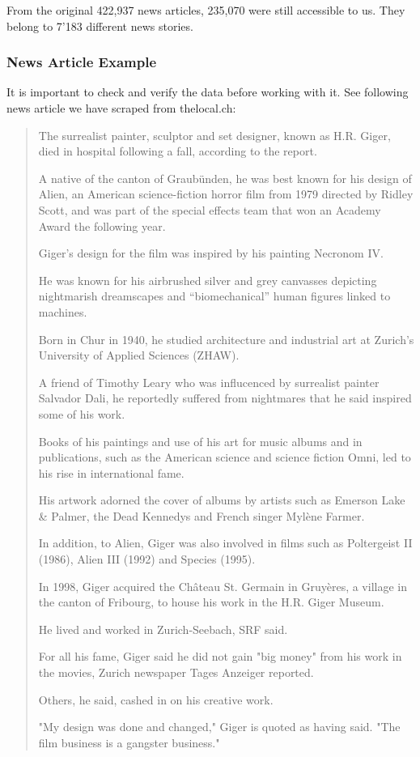 From the original 422,937 news articles, 235,070 were still accessible to us.
They belong to 7'183 different news stories.

\subsubsection{News Article Example}
\label{subsubsec:4a_news_article_example}
It is important to check and verify the data before working with it.
See following news article we have scraped from thelocal.ch\cite{HRGiger}:

\begin{quote}
    The surrealist painter, sculptor and set designer, known as H.R. Giger,
    died in hospital following a fall, according to the report.

    A native of the canton of Graubünden, he was best known for his design of Alien,
    an American science-fiction horror film from 1979 directed by Ridley Scott,
    and was part of the special effects team that won an Academy Award the following year.

    Giger’s design for the film was inspired by his painting Necronom IV.

    He was known for his airbrushed silver and grey canvasses
    depicting nightmarish dreamscapes and “biomechanical” human figures linked to machines.

    Born in Chur in 1940, he studied architecture and industrial art at
    Zurich’s University of Applied Sciences (ZHAW).

    A friend of Timothy Leary who was influcenced by surrealist painter Salvador Dali,
    he reportedly suffered from nightmares that he said inspired some of his work.

    Books of his paintings and use of his art for music albums and in publications,
    such as the American science and science fiction Omni, led to his rise in international fame.

    His artwork adorned the cover of albums by artists such as Emerson Lake \& Palmer,
    the Dead Kennedys and French singer Mylène Farmer.

    In addition, to Alien, Giger was also involved in films such as Poltergeist II (1986),
    Alien III (1992) and Species (1995).

    In 1998, Giger acquired the Château St. Germain in Gruyères,
    a village in the canton of Fribourg, to house his work in the H.R. Giger Museum.

    He lived and worked in Zurich-Seebach, SRF said.

    For all his fame, Giger said he did not gain "big money" from his work in the movies,
    Zurich newspaper Tages Anzeiger reported.

    Others, he said, cashed in on his creative work.

    "My design was done and changed," Giger is quoted as having said.
    "The film business is a gangster business."
\end{quote}

